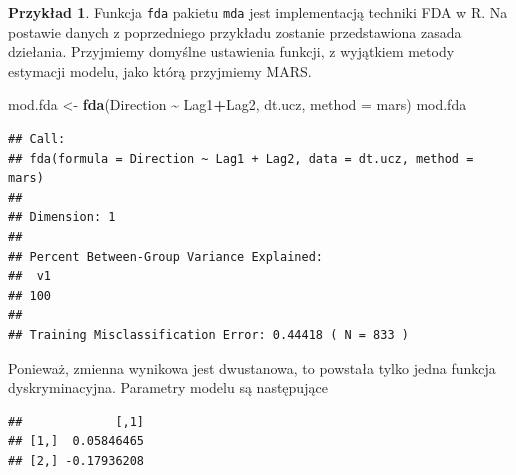 \documentclass[
]{book}
\newenvironment{Shaded}{\begin{snugshade}}{\end{snugshade}}
\newcommand{\AttributeTok}[1]{\textcolor[rgb]{0.13,0.29,0.53}{#1}}
\newcommand{\FunctionTok}[1]{\textcolor[rgb]{0.13,0.29,0.53}{\textbf{#1}}}
\newcommand{\NormalTok}[1]{#1}
\newcommand{\OtherTok}[1]{\textcolor[rgb]{0.56,0.35,0.01}{#1}}
\newcommand{\SpecialCharTok}[1]{\textcolor[rgb]{0.81,0.36,0.00}{\textbf{#1}}}
\theoremstyle{plain}
\theoremstyle{definition}
\theoremstyle{definition}
\theoremstyle{definition}
\newtheorem{example}{Przykład}[chapter]
\theoremstyle{definition}
\theoremstyle{definition}
\theoremstyle{remark}
\begin{document}
\begin{example}
\protect\hypertarget{exm:przykFDA}{}\label{exm:przykFDA}Funkcja \texttt{fda} pakietu \texttt{mda} jest implementacją techniki FDA w R. Na postawie danych z poprzedniego przykładu zostanie przedstawiona zasada dziełania. Przyjmiemy domyślne ustawienia funkcji, z wyjątkiem metody estymacji modelu, jako którą przyjmiemy MARS.
\end{example}

\begin{Shaded}
\begin{Highlighting}[]
\NormalTok{mod.fda }\OtherTok{\textless{}{-}} \FunctionTok{fda}\NormalTok{(Direction }\SpecialCharTok{\textasciitilde{}}\NormalTok{ Lag1}\SpecialCharTok{+}\NormalTok{Lag2, dt.ucz, }\AttributeTok{method =}\NormalTok{ mars)}
\NormalTok{mod.fda}
\end{Highlighting}
\end{Shaded}

\begin{verbatim}
## Call:
## fda(formula = Direction ~ Lag1 + Lag2, data = dt.ucz, method = mars)
## 
## Dimension: 1 
## 
## Percent Between-Group Variance Explained:
##  v1 
## 100 
## 
## Training Misclassification Error: 0.44418 ( N = 833 )
\end{verbatim}

Ponieważ, zmienna wynikowa jest dwustanowa, to powstała tylko jedna funkcja dyskryminacyjna.
Parametry modelu są następujące

\begin{Shaded}
\end{Shaded}

\begin{verbatim}
##             [,1]
## [1,]  0.05846465
## [2,] -0.17936208
\end{verbatim}

\begin{Shaded}
\end{Shaded}
\end{document}
